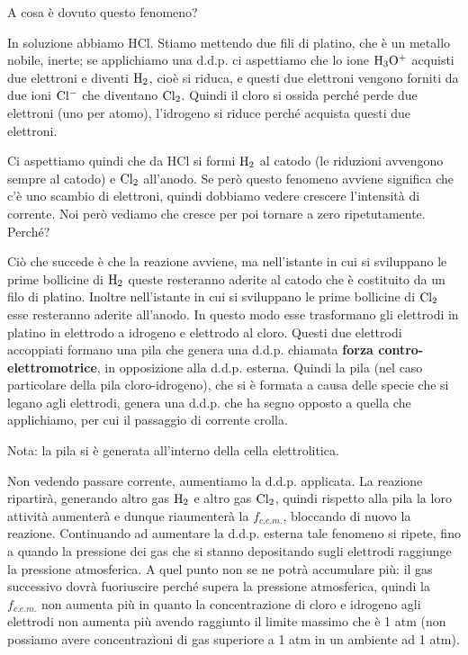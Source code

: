 \vspace{-0.5cm}A cosa è dovuto questo fenomeno?

In soluzione abbiamo HCl. Stiamo mettendo due fili di platino, che è un metallo nobile, inerte; se applichiamo una d.d.p. ci aspettiamo che lo ione $\rm H_3O^+$ acquisti due elettroni e diventi $\rm H_2$, cioè si riduca, e questi due elettroni vengono forniti da due ioni $\rm Cl^-$ che diventano $\rm Cl_2$. Quindi il cloro si ossida perché perde due elettroni (uno per atomo), l'idrogeno si riduce perché acquista questi due elettroni.

Ci aspettiamo quindi che da HCl si formi $\rm H_2$ al catodo (le riduzioni avvengono sempre al catodo) e $\rm Cl_2$ all'anodo. Se però questo fenomeno avviene significa che c'è uno scambio di elettroni, quindi dobbiamo vedere crescere l'intensità di corrente. Noi però vediamo che cresce per poi tornare a zero ripetutamente. Perché?

Ciò che succede è che la reazione avviene, ma nell'istante in cui si sviluppano le prime bollicine di $\rm H_2$ queste resteranno aderite al catodo che è costituito da un filo di platino. Inoltre nell'istante in cui si sviluppano le prime bollicine di $\rm Cl_2$ esse resteranno aderite all'anodo. In questo modo esse trasformano gli elettrodi in platino in elettrodo a idrogeno e elettrodo al cloro. Questi due elettrodi accoppiati formano una pila che genera una d.d.p. chiamata \textbf{forza contro-elettromotrice}, in opposizione alla d.d.p. esterna. Quindi la pila (nel caso particolare della pila cloro-idrogeno), che si è formata a causa delle specie che si legano agli elettrodi, genera una d.d.p. che ha segno opposto a quella che applichiamo, per cui il passaggio di corrente crolla.

Nota: la pila si è generata all'interno della cella elettrolitica.

Non vedendo passare corrente, aumentiamo la d.d.p. applicata. La reazione ripartirà, generando altro gas $\rm H_2$ e altro gas $\rm Cl_2$, quindi rispetto alla pila la loro attività aumenterà e dunque riaumenterà la $f_{c.e.m.}$, bloccando di nuovo la reazione. Continuando ad aumentare la d.d.p. esterna tale fenomeno si ripete, fino a quando la pressione dei gas che si stanno depositando sugli elettrodi raggiunge la pressione atmosferica. A quel punto non se ne potrà accumulare più: il gas successivo dovrà fuoriuscire perché supera la pressione atmosferica, quindi la $f_{c.e.m.}$ non aumenta più in quanto la concentrazione di cloro e idrogeno agli elettrodi non aumenta più avendo raggiunto il limite massimo che è 1 atm (non possiamo avere concentrazioni di gas superiore a 1 atm in un ambiente ad 1 atm). 


